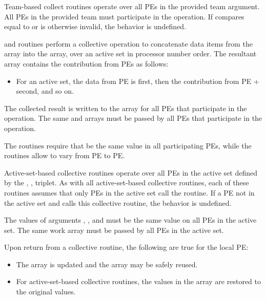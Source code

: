 \begin{apidefinition}
{    Team-based collect routines operate over all \acp{PE} in the provided team argument. All
    \acp{PE} in the provided team must participate in the operation.
    If  compares equal to  or is
    otherwise invalid, the behavior is undefined.

\begin{DeprecateBlock}
    \openshmem {} and  routines perform a collective
    operation to concatenate 
    data items from the \source{} array into the
    \dest{} array, over an \openshmem active set
    in processor number order. The resultant \dest{} array contains the contribution from
	\acp{PE} as follows:
    \begin{itemize}
   		 \item For an active set, the data from \ac{PE}  is first, then the
   		 contribution from \ac{PE}  +  second, and so on.
   	\end{itemize}

    The collected result is written to the \dest{} array for all \acp{PE}
    that participate in the operation. The same \dest{} and \source{}
    arrays must be passed by all \acp{PE} that participate in the operation.
    
    The  routines require that  be the same value in all
    participating \acp{PE}, while the  routines allow  to
    vary from \ac{PE} to \ac{PE}.

    Active-set-based collective routines operate over all \acp{PE} in the active set
    defined by the , ,  triplet.
    As with all active-set-based collective routines,
    each of these routines assumes that
    only \acp{PE} in the active set call the routine. If a \ac{PE} not in the
    active set and calls this collective routine, the behavior is undefined.
    
    The values of arguments , , and 
    must be the same value on all \acp{PE} in the active set. The same
     work array must be passed by all \acp{PE} in the active set.
    
    Upon return from a collective routine, the following are true for the local
    \ac{PE}:
    \begin{itemize}
    \item The \dest{} array is updated and the \source{} array may be safely reused. 
    \item For active-set-based collective routines, the values in the  array are
    restored to the original values.
    \end{itemize}
\end{DeprecateBlock}
}


\end{apidefinition}

